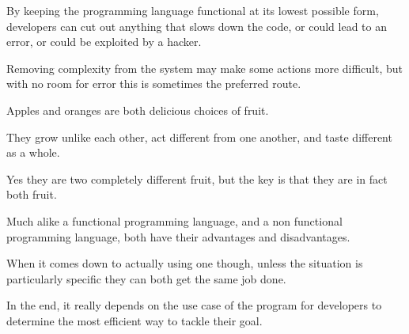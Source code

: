 \documentclass{article}
\begin{document}
\medskip\noindent
By keeping the programming language functional at its lowest possible form, developers can cut out anything that slows down the code, or could lead to an error, or could be exploited by a hacker.

\medskip\noindent
Removing complexity from the system may make some actions more difficult, but with no room for error this is sometimes the preferred route.

\medskip\noindent
Apples and oranges are both delicious choices of fruit.

\medskip\noindent
They grow unlike each other, act different from one another, and taste different as a whole.

\medskip\noindent
Yes they are two completely different fruit, but the key is that they are in fact both fruit.

\medskip\noindent
Much alike a functional programming language, and a non functional programming language, both have their advantages and disadvantages.

\medskip\noindent
When it comes down to actually using one though, unless the situation is particularly specific they can both get the same job done.

\medskip\noindent
In the end, it really depends on the use case of the program for developers to determine the most efficient way to tackle their goal.
\end{document}
